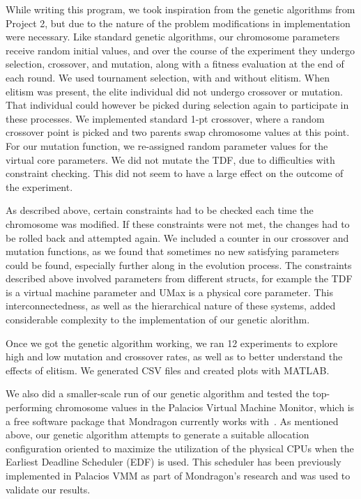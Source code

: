 \documentclass[11pt]{article}
\begin{document}
While writing this program, we took inspiration from the genetic algorithms from Project 2, but due to the nature of the problem modifications in implementation were necessary. Like standard genetic algorithms, our chromosome parameters receive random initial values, and over the course of the experiment they undergo selection, crossover, and mutation, along with a fitness evaluation at the end of each round. We used tournament selection, with and without elitism. When elitism was present, the elite individual did not undergo crossover or mutation. That individual could however be picked during selection again to participate in these processes. We implemented standard 1-pt crossover, where a random crossover point is picked and two parents swap chromosome values at this point. For our mutation function, we re-assigned random parameter values for the virtual core parameters. We did not mutate the TDF, due to difficulties with constraint checking. This did not seem to have a large effect on the outcome of the experiment. 

As described above, certain constraints had to be checked each time the chromosome was modified. If these constraints were not met, the changes had to be rolled back and attempted again. We included a counter in our crossover and mutation functions, as we found that sometimes no new satisfying parameters could be found, especially further along in the evolution process. The constraints described above involved parameters from different structs, for example the TDF is a virtual machine parameter and UMax is a physical core parameter. This interconnectedness, as well as the hierarchical nature of these systems, added considerable complexity to the implementation of our genetic alorithm. 

Once we got the genetic algorithm working, we ran 12 experiments to explore high and low mutation and crossover rates, as well as to better understand the effects of elitism. We generated CSV files and created plots with MATLAB. 

We also did a smaller-scale run of our genetic algorithm and tested the top-performing chromosome values in the Palacios Virtual Machine Monitor, which is a free software package that Mondragon currently works with~\cite{Mondragon:13}. As mentioned above, our genetic algorithm attempts to generate a suitable allocation configuration oriented to maximize the utilization of the physical CPUs when the Earliest Deadline Scheduler (EDF) is used. This scheduler has been previously implemented in Palacios VMM as part of Mondragon's research and was used to validate our results.
\end{document}

